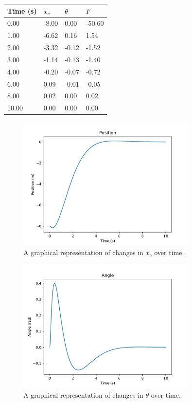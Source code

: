 \documentclass[12pt]{article}
\begin{document}
\begin{center}
    \begin{tabular}{|l|l|l|l|}
        \hline
        Time (s) & $x _c$ & $\theta$ & $F$ \\
        \hline
        0.00 & -8.00 & 0.00 & -50.60 \\
        \hline
        1.00 & -6.62 & 0.16 & 1.54 \\
        \hline
        2.00 & -3.32 & -0.12 & -1.52 \\
        \hline
        3.00 & -1.14 & -0.13 & -1.40 \\
        \hline
        4.00 & -0.20 & -0.07 & -0.72 \\
        \hline
        6.00 & 0.09 & -0.01 & -0.05 \\
        \hline
        8.00 & 0.02 & 0.00 & 0.02 \\
        \hline
        10.00 & 0.00 & 0.00 & 0.00 \\
        \hline
    \end{tabular}
     \label{motion_statistics}
\end{center}

\begin{figure}[H]
    \centering
    \includegraphics[width=0.8\textwidth]{position}
    \caption{\label{position} A graphical representation of changes in $x _c$ over time.}
\end{figure}

\begin{figure}[H]
    \centering
    \includegraphics[width=0.8\textwidth]{angle}
    \caption{\label{angle} A graphical representation of changes in $\theta$ over time.}
\end{figure}
\end{document}
